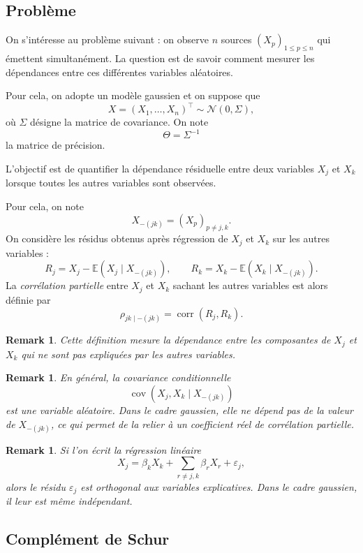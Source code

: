 \documentclass[10pt]{article}
\newtheorem{rem}[thm]{Remark}
\newcommand{\E}{\mathbb{E}}
\DeclareMathOperator{\cov}{cov}
\DeclareMathOperator{\corr}{corr}
\begin{document}
\subsection{Problème}
On s'intéresse au problème suivant : on observe $n$ sources
$(X_p)_{1 \leq p \leq n}$ qui émettent simultanément.
La question est de savoir comment mesurer les dépendances entre ces différentes variables aléatoires.

Pour cela, on adopte un modèle gaussien et on suppose que
\[
	X=(X_1,\dots,X_n)^\top \sim \mathcal N(0,\Sigma),
\]
où $\Sigma$ désigne la matrice de covariance. On note
\[
	\Theta = \Sigma^{-1}
\]
la matrice de précision.

L'objectif est de quantifier la dépendance résiduelle entre deux variables $X_j$ et $X_k$ lorsque toutes les autres variables sont observées.

\medskip

Pour cela, on note
\[
	X_{-(jk)}=(X_p)_{p\neq j,k}.
\]
On considère les résidus obtenus après régression de $X_j$ et $X_k$ sur les autres variables :
\[
	R_j = X_j - \E(X_j\mid X_{-(jk)}),
	\qquad
	R_k = X_k - \E(X_k\mid X_{-(jk)}).
\]
La \emph{corrélation partielle} entre $X_j$ et $X_k$ sachant les autres variables est alors définie par
\[
	\rho_{jk\mid -(jk)} = \corr(R_j,R_k).
\]

\begin{rem}
	Cette définition mesure la dépendance entre les composantes de $X_j$ et $X_k$ qui ne sont pas expliquées par les autres variables.
\end{rem}

\begin{rem}
	En général, la covariance conditionnelle
	\[
		\cov(X_j,X_k\mid X_{-(jk)})
	\]
	est une variable aléatoire. Dans le cadre gaussien, elle ne dépend pas de la valeur de $X_{-(jk)}$, ce qui permet de la relier à un coefficient réel de corrélation partielle.
\end{rem}

\begin{rem}
	Si l'on écrit la régression linéaire
	\[
		X_j = \beta_k X_k + \sum_{r\neq j,k}\beta_r X_r + \varepsilon_j,
	\]
	alors le résidu $\varepsilon_j$ est orthogonal aux variables explicatives. Dans le cadre gaussien, il leur est même indépendant.
\end{rem}

\subsection{Complément de Schur}
\end{document}
